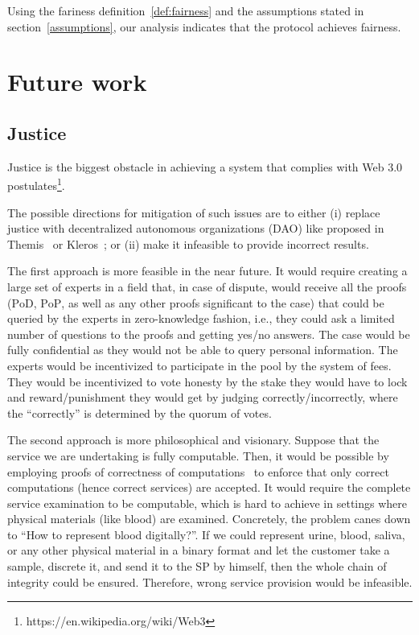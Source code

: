 \documentclass{ieeeaccess}
\begin{document}
Using the fariness definition~\ref{def:fairness} and the assumptions stated in section~\ref{assumptions}, our analysis indicates that the protocol achieves fairness.


\section{Future work}
\label{sec:future-work}

\subsection{Justice}\label{justice}

Justice is the biggest obstacle in achieving a system that complies with Web 3.0 postulates\footnote{https://en.wikipedia.org/wiki/Web3}.

The possible directions for mitigation of such issues are to either (i) replace justice with decentralized autonomous organizations (DAO) like proposed in Themis~\cite{mengThemisDecentralizedEscrow2019} or Kleros~\cite{bergollaKlerosSociolegalCase2022}; or (ii) make it infeasible to provide incorrect results.

The first approach is more feasible in the near future. It would require creating a large set of experts in a field that, in case of dispute, would receive all the proofs ($\mathrm{PoD}$, $\mathrm{PoP}$, as well as any other proofs significant to the case) that could be queried by the experts in zero-knowledge fashion, i.e., they could ask a limited number of questions to the proofs and getting yes/no answers. The case would be fully confidential as they would not be able to query personal information. The experts would be incentivized to participate in the pool by the system of fees. They would be incentivized to vote honesty by the stake they would have to lock and reward/punishment they would get by judging correctly/incorrectly, where the ``correctly'' is determined by the quorum of votes.

The second approach is more philosophical and visionary. Suppose that the service we are undertaking is fully computable. Then, it would be possible by employing proofs of correctness of computations~\cite{ben-sassonSNARKsVerifyingProgram2013} to enforce that only correct computations (hence correct services) are accepted. It would require the complete service examination to be computable, which is hard to achieve in settings where physical materials (like blood) are examined. Concretely, the problem canes down to ``How to represent blood digitally?''. If we could represent urine, blood, saliva, or any other physical material in a binary format and let the customer take a sample, discrete it, and send it to the SP by himself, then the whole chain of integrity could be ensured. Therefore, wrong service provision would be infeasible.
\end{document}
